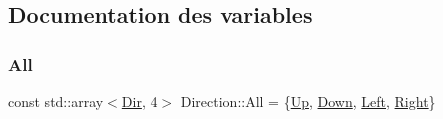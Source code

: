 \subsection{Documentation des variables}
\mbox{\label{namespaceDirection_aabd5fd5d609f7dda7f8f50f1dbd563a7}} 
\subsubsection{\texorpdfstring{All}{All}}
{\footnotesize\ttfamily const std\+::array$<$\hyperlink{namespaceDirection_aaa56ca1cc2883e1cab31b6cbb5054418}{Dir}, 4$>$ Direction\+::\+All = \{\hyperlink{namespaceDirection_aaa56ca1cc2883e1cab31b6cbb5054418a2dcf8e71283b05e59e3b7d1fa4228623}{Up}, \hyperlink{namespaceDirection_aaa56ca1cc2883e1cab31b6cbb5054418aad5dbfe9b746123d7af7381b52a183f1}{Down}, \hyperlink{namespaceDirection_aaa56ca1cc2883e1cab31b6cbb5054418aa6314d583c5d1432de99eb3fda30bdea}{Left}, \hyperlink{namespaceDirection_aaa56ca1cc2883e1cab31b6cbb5054418a1d010c1da83b45aa3ded2cb937d2d979}{Right}\}}

